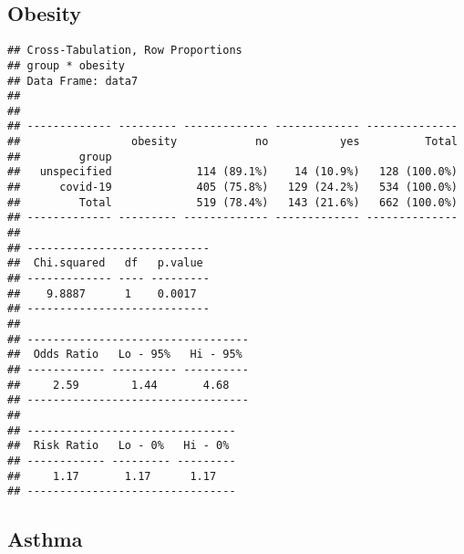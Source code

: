 \documentclass[
]{article}
\newenvironment{Shaded}{\begin{snugshade}}{\end{snugshade}}
\newcommand{\DataTypeTok}[1]{\textcolor[rgb]{0.13,0.29,0.53}{#1}}
\newcommand{\KeywordTok}[1]{\textcolor[rgb]{0.13,0.29,0.53}{\textbf{#1}}}
\newcommand{\NormalTok}[1]{#1}
\newcommand{\OperatorTok}[1]{\textcolor[rgb]{0.81,0.36,0.00}{\textbf{#1}}}
\newcommand{\OtherTok}[1]{\textcolor[rgb]{0.56,0.35,0.01}{#1}}
\newcommand{\StringTok}[1]{\textcolor[rgb]{0.31,0.60,0.02}{#1}}
\begin{document}
\hypertarget{obesity}{%
\subsection{Obesity}\label{obesity}}

\begin{Shaded}
\end{Shaded}

\begin{verbatim}
## Cross-Tabulation, Row Proportions  
## group * obesity  
## Data Frame: data7  
## 
## 
## ------------- --------- ------------- ------------- --------------
##                 obesity            no           yes          Total
##         group                                                     
##   unspecified             114 (89.1%)    14 (10.9%)   128 (100.0%)
##      covid-19             405 (75.8%)   129 (24.2%)   534 (100.0%)
##         Total             519 (78.4%)   143 (21.6%)   662 (100.0%)
## ------------- --------- ------------- ------------- --------------
## 
## ----------------------------
##  Chi.squared   df   p.value 
## ------------- ---- ---------
##    9.8887      1    0.0017  
## ----------------------------
## 
## ----------------------------------
##  Odds Ratio   Lo - 95%   Hi - 95% 
## ------------ ---------- ----------
##     2.59        1.44       4.68   
## ----------------------------------
## 
## --------------------------------
##  Risk Ratio   Lo - 0%   Hi - 0% 
## ------------ --------- ---------
##     1.17       1.17      1.17   
## --------------------------------
\end{verbatim}

\hypertarget{asthma}{%
\subsection{Asthma}\label{asthma}}

\begin{Shaded}
\end{Shaded}
\end{document}
